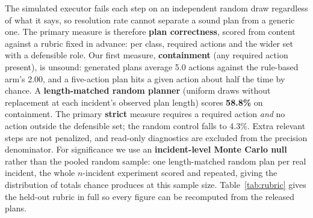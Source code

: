 \documentclass[conference]{IEEEtran}
\begin{document}
The simulated executor fails each step on an independent random draw
regardless of what it says, so resolution rate cannot separate a sound
plan from a generic one. The primary measure is therefore \textbf{plan
correctness}, scored from content against a rubric fixed in advance:
per class, required actions and the wider set with a defensible role.
Our first measure, \textbf{containment} (any required action present),
is unsound: generated plans average 5.0 actions against the rule-based
arm's 2.00, and a five-action plan hits a given action about half the
time by chance. A \textbf{length-matched random planner} (uniform draws
without replacement at each incident's observed plan length) scores
\textbf{58.8\%} on containment. The primary \textbf{strict} measure
requires a required action \emph{and} no action outside the defensible
set; the random control falls to 4.3\%. Extra relevant steps are not
penalized, and read-only diagnostics are excluded from the precision
denominator. For significance we use an \textbf{incident-level Monte
Carlo null} rather than the pooled random sample: one length-matched
random plan per real incident, the whole $n$-incident experiment scored
and repeated, giving the distribution of totals chance produces at this
sample size. Table~\ref{tab:rubric} gives the held-out rubric in full so
every figure can be recomputed from the released plans.
\end{document}
